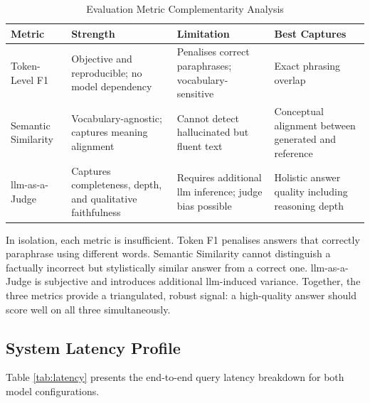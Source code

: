 \begin{table}[H]

\centering

\caption{Evaluation Metric Complementarity Analysis}

\label{tab:metric_comparison}

\begin{tabular}{|p{3cm}|p{4cm}|p{4cm}|p{3cm}|}

\hline

\textbf{Metric} & \textbf{Strength} & \textbf{Limitation} & \textbf{Best Captures} \\

\hline

Token-Level F1 & Objective and reproducible; no model dependency & Penalises correct paraphrases; vocabulary-sensitive & Exact phrasing overlap \\

\hline

Semantic Similarity & Vocabulary-agnostic; captures meaning alignment & Cannot detect hallucinated but fluent text & Conceptual alignment between generated and reference \\

\hline

\gls{llm}-as-a-Judge & Captures completeness, depth, and qualitative faithfulness & Requires additional \gls{llm} inference; judge bias possible & Holistic answer quality including reasoning depth \\

\hline

\end{tabular}

\end{table}

In isolation, each metric is insufficient. Token F1 penalises answers that correctly paraphrase using different words. Semantic Similarity cannot distinguish a factually incorrect but stylistically similar answer from a correct one. \gls{llm}-as-a-Judge is subjective and introduces additional \gls{llm}-induced variance. Together, the three metrics provide a triangulated, robust signal: a high-quality answer should score well on all three simultaneously.

\subsection{System Latency Profile}

Table \ref{tab:latency} presents the end-to-end query latency breakdown for both model configurations.


